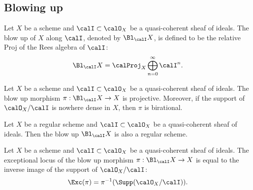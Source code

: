 \subsection{Blowing up}

    \begin{definition}\label{def:blow_up}
        Let \(X\) be a scheme and \(\calI \subset \calO_X\) be a quasi-coherent sheaf of ideals.
        The blow up of \(X\) along \(\calI\), denoted by \(\Bl_\calI X\), is defined to be the relative Proj of the Rees algebra of \(\calI\):
        \[
            \Bl_\calI X = \calProj_X \bigoplus_{n=0}^\infty \calI^n.
        \]
    \end{definition}

    \begin{proposition}\label{prop:blow_up_is_birational_and_projective}
        Let \(X\) be a scheme and \(\calI \subset \calO_X\) be a quasi-coherent sheaf of ideals.
        The blow up morphism \(\pi : \Bl_\calI X \to X\) is projective.
        Moreover, if the support of \(\calO_X / \calI\) is nowhere dense in \(X\), then \(\pi\) is birational.
    \end{proposition}

    \begin{proposition}\label{prop:blow_up_regular_is_regular}
        Let \(X\) be a regular scheme and \(\calI \subset \calO_X\) be a quasi-coherent sheaf of ideals.
        Then the blow up \(\Bl_\calI X\) is also a regular scheme.
    \end{proposition}

    \begin{proposition}\label{prop:exceptional_locus_of_blow_up}
        Let \(X\) be a scheme and \(\calI \subset \calO_X\) be a quasi-coherent sheaf of ideals.
        The exceptional locus of the blow up morphism \(\pi : \Bl_\calI X \to X\) is equal to the inverse image of the support of \(\calO_X / \calI\):
        \[
            \Exc(\pi) = \pi^{-1}(\Supp(\calO_X / \calI)).
        \]
    \end{proposition}


